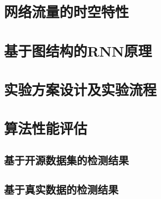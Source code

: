 \section{网络流量的时空特性}

\section{基于图结构的RNN原理}

\section{实验方案设计及实验流程}

\section{算法性能评估}

\subsection{基于开源数据集的检测结果}

\subsection{基于真实数据的检测结果}